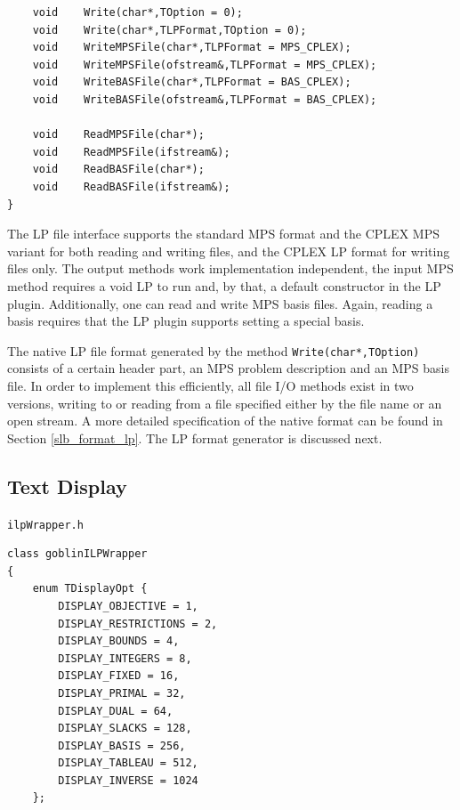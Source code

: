 \documentclass[a4paper,11pt,twoside]{book}
\begin{document}
\begin{multicols}{2}
\begin{mymethods}
\begin{verbatim}
    void    Write(char*,TOption = 0);
    void    Write(char*,TLPFormat,TOption = 0);
    void    WriteMPSFile(char*,TLPFormat = MPS_CPLEX);
    void    WriteMPSFile(ofstream&,TLPFormat = MPS_CPLEX);
    void    WriteBASFile(char*,TLPFormat = BAS_CPLEX);
    void    WriteBASFile(ofstream&,TLPFormat = BAS_CPLEX);

    void    ReadMPSFile(char*);
    void    ReadMPSFile(ifstream&);
    void    ReadBASFile(char*);
    void    ReadBASFile(ifstream&);
}
\end{verbatim}
\end{mymethods}
The LP file interface supports the standard MPS format and the CPLEX MPS
variant for both reading and writing files, and the CPLEX LP format for
writing files only. The output methods work implementation independent, the
input MPS method requires a void LP to run and, by that, a default constructor
in the LP plugin. Additionally, one can read and write MPS basis files.
Again, reading a basis requires that the LP plugin supports setting a special
basis.

The native LP file format generated by the method \verb/Write(char*,TOption)/
consists of a certain header part, an MPS problem description and an MPS basis
file. In order to implement this efficiently, all file I/O methods exist in two
versions, writing to or reading from a file specified either by the file name
or an open stream. A more detailed specification of the native format can be
found in Section \ref{slb_format_lp}. The LP format generator is discussed next.


\newpage
\subsection{Text Display}
\label{slb_lp_text_form}
\myinclude\verb/ilpWrapper.h/
\begin{mymethods}
\begin{verbatim}
class goblinILPWrapper
{
    enum TDisplayOpt {
        DISPLAY_OBJECTIVE = 1,
        DISPLAY_RESTRICTIONS = 2,
        DISPLAY_BOUNDS = 4,
        DISPLAY_INTEGERS = 8,
        DISPLAY_FIXED = 16,
        DISPLAY_PRIMAL = 32,
        DISPLAY_DUAL = 64,
        DISPLAY_SLACKS = 128,
        DISPLAY_BASIS = 256,
        DISPLAY_TABLEAU = 512,
        DISPLAY_INVERSE = 1024
    };
    

\end{verbatim}
\end{mymethods}
\end{multicols}
\end{document}
